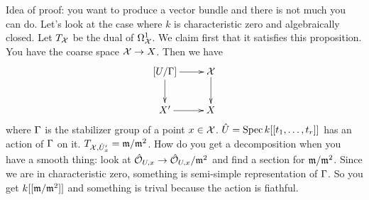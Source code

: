 Idea of proof: you want to produce a vector bundle and there is not
much you can do. Let's look at the case where $k$ is characteristic
zero and algebraically closed. Let $T_{\mathcal{X}}$ be the dual of $\Omega^1_{\mathcal{X}}$.
We claim first that it satisfies this proposition. You have the
coarse space $\mathcal{X}\to X$. Then we have
\[\xymatrix{
  [U/\Ga]\ar[d]\ar[r] & \X\ar[d]\\
  X'\ar[r] & X
}\]
where $\Gamma$ is the stabilizer group of a point $x\in \mathcal{X}$. $\hat
U=\operatorname{Spec} k[[t_1,\dots, t_r]]$ has an action of $\Gamma$ on it.
$T_{\mathcal{X},\hat U_x'}=\mathfrak{m}/\mathfrak{m}^2$. How do you get a decomposition when you
have a smooth thing: look at $\hat {\mathcal{O}}_{U,x}\to \hat {\mathcal{O}}_{U,x}/\mathfrak{m}^2$
and find a section for $\mathfrak{m}/\mathfrak{m}^2$. Since we are in characteristic
zero, something is semi-simple representation of $\Gamma$. So you get
$k[[\mathfrak{m}/\mathfrak{m}^2]]$ and something is trival because the action is fiathful.






